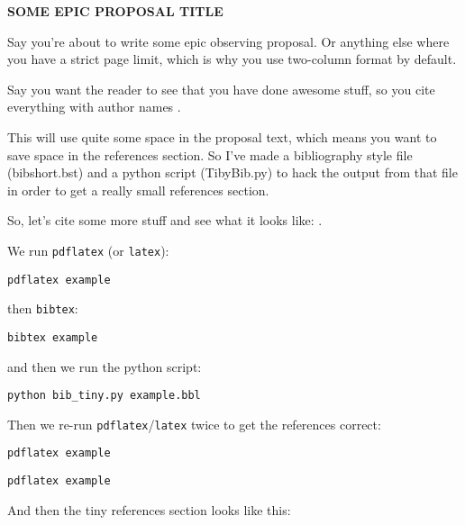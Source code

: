 \documentclass[letterpaper,11pt,twocolumn]{article}
\begin{document}
\pagestyle{plain}




\begin{center} 
\bfseries\uppercase{
Some epic proposal title
}
\end{center}


Say you're about to write some epic observing proposal. Or anything else where you have a strict page limit, which is why you use two-column format by default.

Say you want the reader to see that you have done awesome stuff, so you cite everything with author names \citep{Poppenhaeger2013}.

This will use quite some space in the proposal text, which means you want to save space in the references section. So I've made a bibliography style file (bibshort.bst) and a python script (TibyBib.py) to hack the output from that file in order to get a really small references section.

So, let's cite some more stuff and see what it looks like: \cite{Guenther2012, Robrade2012, Albrecht2012}. 

\bigskip

We run \verb+pdflatex+ (or \verb+latex+):

\bigskip

\verb+pdflatex example+

\bigskip

then \verb+bibtex+:

\bigskip

\verb+bibtex example+

\bigskip

and then we run the python script:

\bigskip
\verb+python bib_tiny.py example.bbl+

\bigskip

Then we re-run \verb+pdflatex+/\verb+latex+ twice to get the references correct:

\bigskip

\verb+pdflatex example+

\verb+pdflatex example+

\bigskip

And then the tiny references section looks like this:

\begin{footnotesize}




\end{footnotesize}


\end{document}

